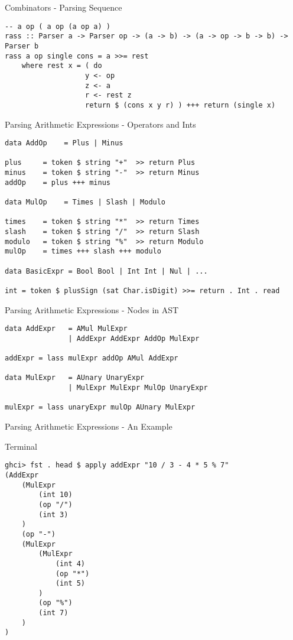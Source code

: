 \documentclass[12pt]{beamer}
\newcommand{\codesize}{\fontsize{7.7}{7.7}}
\begin{document}
\begin{spacing}{1.3}
\begin{frame}[fragile=singleslide]{Combinators - Parsing Sequence}
\begin{verbatim}
-- a op ( a op (a op a) )
rass :: Parser a -> Parser op -> (a -> b) -> (a -> op -> b -> b) -> Parser b
rass a op single cons = a >>= rest
    where rest x = ( do
                   y <- op
                   z <- a
                   r <- rest z
                   return $ (cons x y r) ) +++ return (single x)
\end{verbatim}
\end{frame}

\begin{frame}[fragile=singleslide]{Parsing Arithmetic Expressions - Operators and Ints}
\begin{verbatim}
data AddOp    = Plus | Minus

plus     = token $ string "+"  >> return Plus
minus    = token $ string "-"  >> return Minus
addOp    = plus +++ minus

data MulOp    = Times | Slash | Modulo

times    = token $ string "*"  >> return Times
slash    = token $ string "/"  >> return Slash
modulo   = token $ string "%"  >> return Modulo
mulOp    = times +++ slash +++ modulo

data BasicExpr = Bool Bool | Int Int | Nul | ...

int = token $ plusSign (sat Char.isDigit) >>= return . Int . read
\end{verbatim}
\end{frame}

\begin{frame}[fragile=singleslide]{Parsing Arithmetic Expressions - Nodes in AST}
\begin{verbatim}
data AddExpr   = AMul MulExpr
               | AddExpr AddExpr AddOp MulExpr

addExpr = lass mulExpr addOp AMul AddExpr

data MulExpr   = AUnary UnaryExpr
               | MulExpr MulExpr MulOp UnaryExpr

mulExpr = lass unaryExpr mulOp AUnary MulExpr
\end{verbatim}
\end{frame}

\begin{frame}[fragile=singleslide]{Parsing Arithmetic Expressions - An Example}
\begin{block}{Terminal}
\begin{verbatim}
ghci> fst . head $ apply addExpr "10 / 3 - 4 * 5 % 7"
(AddExpr
    (MulExpr
        (int 10)
        (op "/")
        (int 3)
    )
    (op "-")
    (MulExpr
        (MulExpr
            (int 4)
            (op "*")
            (int 5)
        )
        (op "%")
        (int 7)
    )
)
\end{verbatim}
\end{block}
\end{frame}


\end{spacing}
\end{document}
